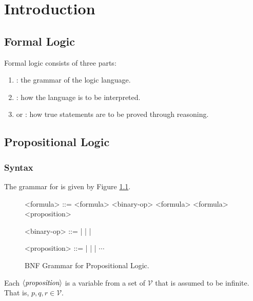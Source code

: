 \chapter{Introduction}

\section{Formal Logic}

Formal logic consists of three parts:

\begin{enumerate}
    \item {}: the grammar of the logic language.
    \item {}: how the language is to be interpreted.
    \item {} or : how true statements are
        to be proved through reasoning.
\end{enumerate}

\section{Propositional Logic}

\subsection{Syntax}

The grammar for  is given by Figure 
\ref{fig:propositional_logic_bnf}.

\begin{figure}[H]
    \centering
    \begin{grammar}
    <formula> ::= \lit{$($} <formula> <binary-op> <formula> \lit{$)$}
        \alt \lit{$\neg$} <formula>
        \alt <proposition>
    
    <binary-op> ::= \lit{$\land$} | \lit{$\lor$} | \lit{$\to$} | \lit{$\Iff$}
    
    <proposition> ::=  |  |  | $\cdots$
    \end{grammar}
    \caption{BNF Grammar for Propositional Logic.}
    \label{fig:propositional_logic_bnf}
\end{figure}

Each $\langle {\textit{proposition}} \rangle$ is a variable from a set of
 $\mathcal{V}$ that is assumed to be infinite. That is, 
$p, q, r \in \mathcal{V}$.

